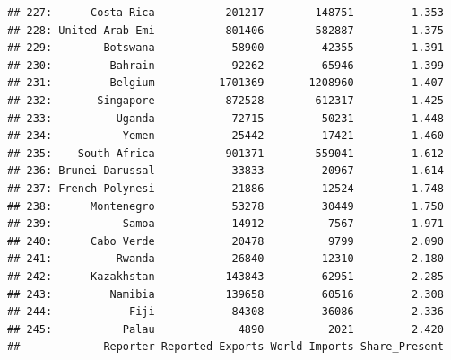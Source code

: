 \documentclass[10pt,]{article}
\begin{document}
\begin{verbatim}
## 227:      Costa Rica           201217        148751         1.353
## 228: United Arab Emi           801406        582887         1.375
## 229:        Botswana            58900         42355         1.391
## 230:         Bahrain            92262         65946         1.399
## 231:         Belgium          1701369       1208960         1.407
## 232:       Singapore           872528        612317         1.425
## 233:          Uganda            72715         50231         1.448
## 234:           Yemen            25442         17421         1.460
## 235:    South Africa           901371        559041         1.612
## 236: Brunei Darussal            33833         20967         1.614
## 237: French Polynesi            21886         12524         1.748
## 238:      Montenegro            53278         30449         1.750
## 239:           Samoa            14912          7567         1.971
## 240:      Cabo Verde            20478          9799         2.090
## 241:          Rwanda            26840         12310         2.180
## 242:      Kazakhstan           143843         62951         2.285
## 243:         Namibia           139658         60516         2.308
## 244:            Fiji            84308         36086         2.336
## 245:           Palau             4890          2021         2.420
##             Reporter Reported Exports World Imports Share_Present
\end{verbatim}
\end{document}
